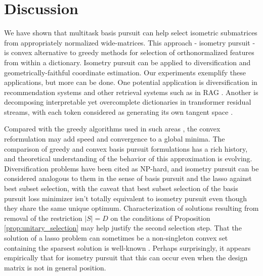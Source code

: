 \section{Discussion}
\label{sec:discussion}

We have shown that multitask basis pursuit can help select isometric submatrices from appropriately normalized wide-matrices.
This approach - isometry pursuit - is convex alternative to greedy methods for selection of orthonormalized features from within a dictionary.
Isometry pursuit can be applied to diversification and geometrically-faithful coordinate estimation.
Our experiments exemplify these applications, but more can be done.
One potential application is diversification in recommendation systems \cite{Carbonell2017-gi, Wu2019-uk, Langchain} and other retrieval systems such as in RAG \cite{Gao2023-cn, Pickett2024-ad, In2024-um, Weiss2024-xm, Vectara}.
Another is decomposing interpretable yet overcomplete dictionaries in transformer residual streams, with each token considered as generating its own tangent space \cite{templeton2024scaling, Makelov2024-bw}.

Compared with the greedy algorithms used in such areas \cite{Carbonell1998-ji, Barioni, Drosou, Qin2012-ok, KUNAVER2017154, Guo-shengbo, Abdool,Yu2016AGA,  Huang2024-wr, Pickett2024-ad}, the convex reformulation may add speed and convergence to a global minima.
The comparison of greedy \cite{Mallat93-wi, Mallat, Pati-93, Tropp05-ml} and convex \cite{Chen2001-hh, Tropp06-sg,Chen2006TheoreticalRO} basis pursuit formulations has a rich history, and theoretical understanding of the behavior of this approximation is evolving.
Diversification problems have been cited as NP-hard, and isometry pursuit can be considered analogous to them in the sense of basis pursuit and the lasso against best subset selection, with the caveat that best subset selection of the basis pursuit loss minimizer isn't totally equivalent to isometry pursuit even though they share the same unique optimum.
Characterization of solutions resulting from removal of the restriction $|S| = D$ on the conditions of Proposition \ref{prop:unitary_selection} may help justify the second selection step.
That the solution of a lasso problem can sometimes be a non-singleton convex set containing the sparsest solution is well-known \cite{Osborne2000OnTL, DOSSAL2012117, Chrtien2011OnTG, Tibshirani2012TheLP, Ewald2017OnTD, Ali2018TheGL, Schneider2020-qt, Mishkin2022TheSP,Dupuis2019TheGO,Debarre2020OnTU,Everink2024TheGA}.
Perhaps surprisingly, it appears empirically that for isometry pursuit that this can occur even when the design matrix is not in general position.

